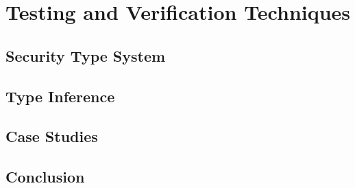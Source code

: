 
\chapter{Testing and Verification Techniques} \label{ch:vul_detect}


\section{Security Type System}


\section{Type Inference}

\section{Case Studies}

\section{Conclusion}
